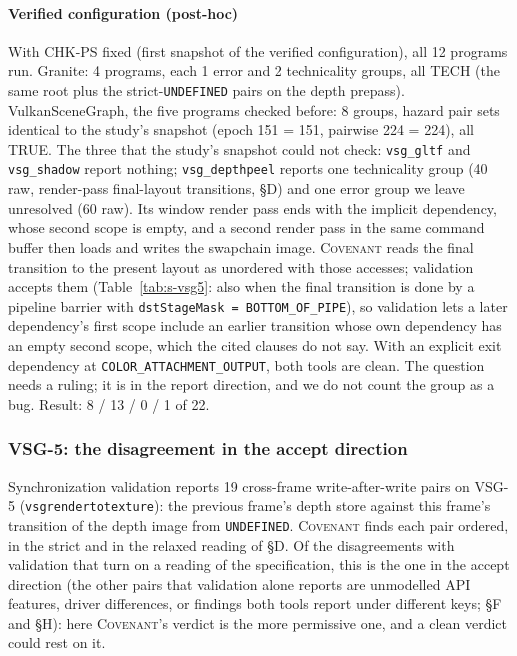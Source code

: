 \documentclass[acmtog,anonymous,review]{acmart}
\newcommand{\sys}{\textsc{Covenant}\xspace}
\newcommand{\code}[1]{\texttt{#1}}
\begin{document}
\paragraph{Verified configuration (post-hoc)}
With CHK-PS fixed (first snapshot of the verified configuration), all 12 programs run. Granite: 4 programs, each 1
error and 2 technicality groups, all TECH (the same root plus the strict-\code{UNDEFINED} pairs on the depth prepass).
VulkanSceneGraph, the five programs checked before: 8 groups, hazard pair sets identical to the study's snapshot
(epoch 151 = 151, pairwise 224 = 224), all TRUE. The three that the study's snapshot could not check:
\code{vsg\_gltf} and \code{vsg\_shadow} report nothing; \code{vsg\_depthpeel} reports one technicality group (40 raw,
render-pass final-layout transitions, \S D) and one error group we leave unresolved (60 raw). Its window render pass
ends with the implicit dependency, whose second scope is empty, and a second render pass in the same command buffer then
loads and writes the swapchain image. \sys reads the final transition to the present layout as unordered with those
accesses; validation accepts them (Table~\ref{tab:s-vsg5}: also when the final transition is done by a pipeline barrier
with \code{dstStageMask = BOTTOM\_OF\_PIPE}), so validation lets a later dependency's first scope include an earlier
transition whose own dependency has an empty second scope, which the cited clauses do not say. With an explicit exit
dependency at \code{COLOR\_ATTACHMENT\_OUTPUT}, both tools are clean. The question needs a ruling; it is in the report
direction, and we do not count the group as a bug. Result: 8 / 13 / 0 / 1 of 22.

\subsubsection{VSG-5: the disagreement in the accept direction}
\label{sup:vsg5}
Synchronization validation reports 19 cross-frame write-after-write pairs on VSG-5 (\code{vsgrendertotexture}): the
previous frame's depth store against this frame's transition of the depth image from \code{UNDEFINED}. \sys finds
each pair ordered, in the strict and in the relaxed reading of \S D. Of the disagreements with validation that turn on
a reading of the specification, this is the one in the accept direction (the other pairs that validation alone reports
are unmodelled API features, driver differences, or findings both tools report under different keys; \S F and \S H): here \sys's verdict is the more permissive one,
and a clean verdict could rest on it.
\end{document}

